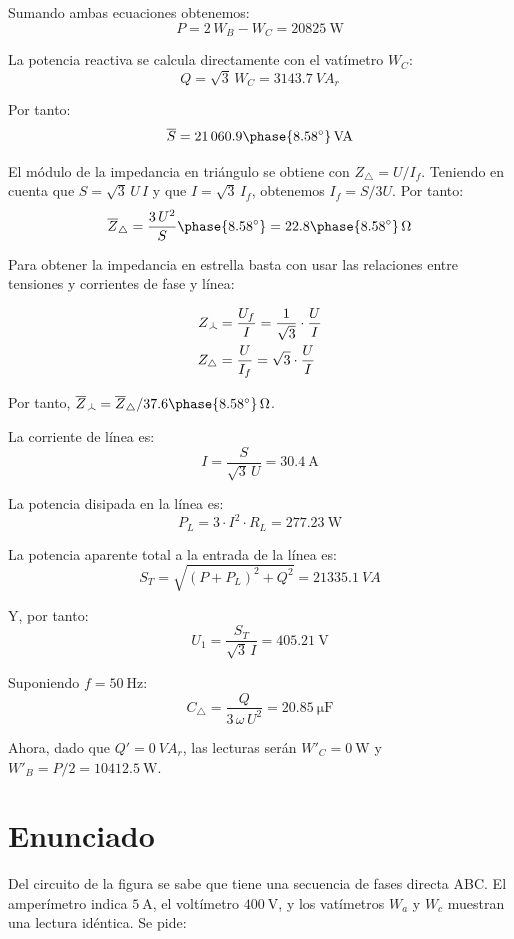 Sumando ambas ecuaciones obtenemos:
\[
  P = 2 \,W_B - W_C = \SI{20825}{\watt}
\]

La potencia reactiva se calcula directamente con el vatímetro $W_C$:
\[
  Q = \sqrt{3} \, W_C = \SI{3143.7}{VA}_r
\]

Por tanto:
\[
  \overline{S} =
  21\,060.9\phase{\ang{8.58}}\,\unit{VA}
\]

El módulo de la impedancia en triángulo se obtiene con
$Z_{\triangle} = U / I_f$. Teniendo en cuenta que $S = \sqrt{3} \,U \,I$
y que $I = \sqrt{3} \,I_f$, obtenemos $I_f = S / 3U$. Por tanto:
\[
  \overline{Z}_{\triangle} = \frac{3 \, U^2}{S}\phase{\ang{8.58}} =
  {22.8\phase{\ang{8.58}}}\,\unit{\ohm}
\]


Para obtener la impedancia en estrella basta con usar las relaciones
entre tensiones y corrientes de fase y línea:

\vspace{-6mm}
\begin{align*}
  Z_{\wye} &= \frac{U_f}{I} = \frac{1}{\sqrt{3}} \cdot \frac{U}{I}\\
  Z_\triangle &= \frac{U}{I_f} = \sqrt{3} \cdot \frac{U}{I}
\end{align*}

Por tanto, $\overline{Z}_{\wye} = \overline{Z}_{\triangle} / 37.6\phase{\ang{8.58}}\,\unit{\ohm}$.

\vspace{3mm}
La corriente de línea es:
\[
  I = \frac{S}{\sqrt{3} \,U} = \SI{30.4}{\ampere}
\]

La potencia disipada en la línea es:
\[
  P_L = 3 \cdot I^2 \cdot R_L = \SI{277.23}{\watt}
\]

La potencia aparente total a la entrada de la línea es:
\[
  S_T = \sqrt{(P + P_L)^2 + Q^2} = \SI{21335.1}{VA}
\]

Y, por tanto:
\[
  U_1 = \frac{S_T}{\sqrt{3} \,I} = \SI{405.21}{\volt}
\]

Suponiendo $f = \SI{50}{\hertz}$:
\[
  C_{\triangle} = \frac{Q}{3 \,\omega \,U^2} = \SI{20.85}{\micro\farad}
\]

Ahora, dado que $Q' = \SI{0}{VA}_r$, las lecturas serán $W'_C = \SI{0}{\watt}$ y
$W'_B = P/2 = \SI{10412.5}{\watt}$.



\section{Enunciado}

Del circuito de la figura se sabe que tiene una secuencia de fases
directa ABC. El amperímetro indica $\SI{5}{\ampere}$, el voltímetro
$\SI{400}{\volt}$, y los vatímetros $W_a$ y $W_c$ muestran una lectura
idéntica. Se pide:

